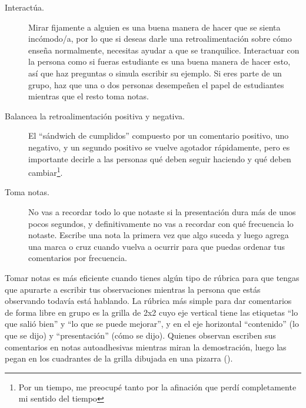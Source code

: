 \begin{description}

\item[Interactúa.]
  Mirar fijamente a alguien es una buena manera de hacer que se sienta incómodo/a,
  por lo que si deseas darle una retroalimentación sobre cómo enseña normalmente,
  necesitas ayudar a que se tranquilice.
  Interactuar con la persona como si fueras estudiante es una buena manera de hacer esto,
  así que haz preguntas o simula escribir su ejemplo.
  Si eres parte de un grupo,
  haz que una o dos personas desempeñen el papel de estudiantes
  mientras que el resto toma notas.

\item[Balancea la retroalimentación positiva y negativa.]
  El ``sándwich de cumplidos'' compuesto por un comentario positivo,
  uno negativo,
  y un segundo positivo
  se vuelve agotador rápidamente,
  pero es importante decirle a las personas qué deben seguir haciendo
  y qué deben cambiar\footnote{
    Por un tiempo,
    me preocupé tanto por la afinación que perdí completamente mi sentido del tiempo
  }.

\item[Toma notas.]
  No vas a recordar todo lo que notaste
  si la presentación dura más de unos pocos segundos,
  y definitivamente no vas a recordar con qué frecuencia lo notaste.
  Escribe una nota la primera vez que algo suceda
  y luego agrega una marca o cruz cuando vuelva a ocurrir
  para que puedas ordenar tus comentarios por frecuencia.

\end{description}

Tomar notas es más eficiente cuando tienes algún tipo de rúbrica
para que tengas que apurarte a escribir tus observaciones
mientras la persona que estás observando todavía está hablando.
La rúbrica más simple para dar comentarios de forma libre en grupo
es la grilla de 2x2 cuyo eje vertical tiene las etiquetas ``lo que salió bien'' y ``lo que se puede mejorar'',
y en el eje horizontal ``contenido'' (lo que se dijo)
y ``presentación'' (cómo se dijo).
Quienes observan escriben sus comentarios en notas autoadhesivas mientras miran la demostración,
luego las pegan en los cuadrantes de la grilla dibujada en una pizarra
().


